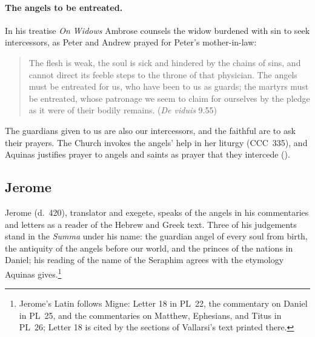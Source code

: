 \paragraph{The angels to be entreated.} In his treatise \emph{On Widows}
Ambrose counsels the widow burdened with sin to seek intercessors, as
Peter and Andrew prayed for Peter's mother-in-law:
\begin{quote}
The flesh is weak, the soul is sick and hindered by the chains of sins,
and cannot direct its feeble steps to the throne of that physician. The
angels must be entreated for us, who have been to us as guards; the
martyrs must be entreated, whose patronage we seem to claim for ourselves
by the pledge as it were of their bodily remains. (\emph{De viduis}
9.55)
\end{quote}
\noindent The guardians given to us are also our intercessors, and the
faithful are to ask their prayers. The Church invokes the angels' help in
her liturgy (CCC~335), and Aquinas justifies prayer to angels and saints
as prayer that they intercede ().

\sectionguard
\subsection{Jerome}\label{sec:fl-jerome}

Jerome (d.~420), translator and exegete, speaks of the angels in his
commentaries and letters as a reader of the Hebrew and Greek text. Three
of his judgements stand in the \emph{Summa} under his name: the guardian
angel of every soul from birth, the antiquity of the angels before our
world, and the princes of the nations in Daniel; his reading of the name
of the Seraphim agrees with the etymology Aquinas gives.\footnote{Jerome's
Latin follows Migne: Letter 18 in PL~22, the commentary on Daniel in
PL~25, and the commentaries on Matthew, Ephesians, and Titus in PL~26;
Letter 18 is cited by the sections of Vallarsi's text printed there.}

